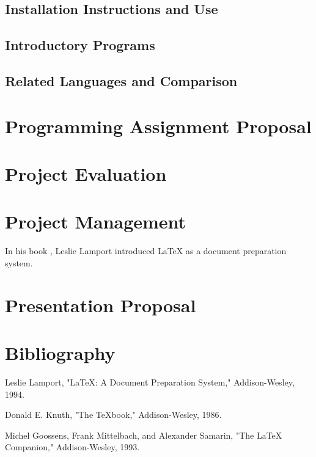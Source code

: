 \documentclass{article}
\begin{document}
\subsection{Installation Instructions and Use}

\subsection{Introductory Programs}

\subsection{Related Languages and Comparison}

\section{Programming Assignment Proposal}

\section{Project Evaluation}

\section{Project Management}
In his book \cite{lamport94}, Leslie Lamport introduced LaTeX as a document preparation system.

\section{Presentation Proposal}

\section{Bibliography}

\begin{thebibliography}{X}

 Leslie Lamport, "LaTeX: A Document Preparation System," Addison-Wesley, 1994.

 Donald E. Knuth, "The TeXbook," Addison-Wesley, 1986.

 Michel Goossens, Frank Mittelbach, and Alexander Samarin, "The LaTeX Companion," Addison-Wesley, 1993.

\end{thebibliography}
\end{document}
